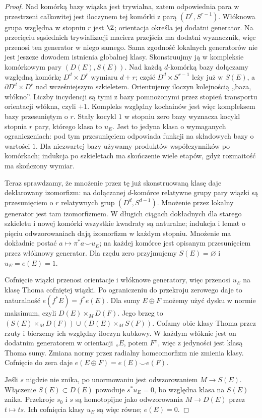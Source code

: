 \begin{proof}
Nad komórką bazy wiązka jest trywialna, zatem odpowiednia
para w przestrzeni całkowitej jest iloczynem tej komórki
z parą $(D^r,S^{r-1})$.
Włóknowa grupa względna
w stopniu $r$ jest $\Z$;
orientacja określa jej
dodatni generator.
Na przecięciu sąsiednich
trywializacji macierz
przejścia ma dodatni
wyznacznik, więc przenosi
ten generator w niego
samego. Sama zgodność lokalnych generatorów nie jest jeszcze
dowodem istnienia globalnej klasy. Skonstruujmy ją
w kompleksie komórkowym pary $(D(E),S(E))$.
Nad każdą $d$-komórką bazy dołączamy względną
komórkę $D^d\times D^r$ wymiaru $d+r$;
część $D^d\times S^{r-1}$ leży już w $S(E)$,
a $\partial D^d\times D^r$ nad wcześniejszym szkieletem.
Orientujemy iloczyn kolejnością „baza, włókno”.
Liczby incydencji są tymi z bazy pomnożonymi
przez stopień transportu orientacji włókna, czyli $+1$.
Kompleks względny kochainów jest więc kompleksem
bazy przesuniętym o $r$. Stały kocykl $1$ w stopniu
zero bazy wyznacza kocykl stopnia $r$ pary,
którego klasa to $u_E$. Jest to jedyna klasa
o wymaganych ograniczeniach: pod tym przesunięciem
odpowiada funkcji na składowych bazy o wartości $1$.
Dla niezwartej bazy używamy produktów współczynników
po komórkach; indukcja po szkieletach ma skończenie
wiele etapów, gdyż rozmaitość ma skończony wymiar.

Teraz sprawdzamy, że mnożenie przez tę już
skonstruowaną klasę daje deklarowany izomorfizm:
na dołączanej $d$-komórce
relatywne grupy pary
wiązki są przesunięciem
o $r$ relatywnych grup
$(D^d,S^{d-1})$.
Mnożenie przez lokalny
generator jest tam
izomorfizmem. W długich
ciągach dokładnych
dla starego szkieletu
i nowej komórki wszystkie
kwadraty są naturalne;
indukcja i lemat o
pięciu odwzorowaniach
dają izomorfizm w
każdym stopniu.
Mnożenie ma dokładnie postać
$a\mapsto\pi^*a\smile u_E$; na każdej komórce
jest opisanym przesunięciem przez włóknowy generator.
Dla rzędu zero przyjmujemy $S(E)=\varnothing$
i $u_E=e(E)=1$.

Cofnięcie wiązki przenosi
orientacje i włóknowe
generatory, więc przenosi
$u_E$ na klasę Thoma
cofniętej wiązki. Po
ograniczeniu do
przekroju zerowego
daje to naturalność
$e(f^*E)=f^*e(E)$.
Dla sumy $E\oplus F$ możemy użyć dysku w normie
maksimum, czyli $D(E)\times_M D(F)$. Jego brzeg to
$(S(E)\times_M D(F))\cup(D(E)\times_M S(F))$.
Cofamy obie klasy Thoma przez rzuty i bierzemy
ich względny iloczyn kubkowy. W każdym włóknie
jest on dodatnim generatorem w orientacji „$E$, potem $F$”,
więc z jedyności jest klasą Thoma sumy.
Zmiana normy przez radialny homeomorfizm nie zmienia
klasy. Cofnięcie do zera daje
$e(E\oplus F)=e(E)\smile e(F)$.

Jeśli $s$ nigdzie
nie znika, po unormowaniu
jest odwzorowaniem
$M\to S(E)$.
Włączenie $S(E)\subset D(E)$
powoduje $s^*u_E=0$,
bo względna klasa
na $S(E)$ znika.
Przekroje $s_0$ i $s$
są homotopijne jako
odwzorowania $M\to D(E)$
przez $t\mapsto ts$.
Ich cofnięcia klasy
$u_E$ są więc równe;
$e(E)=0$.
\end{proof}

